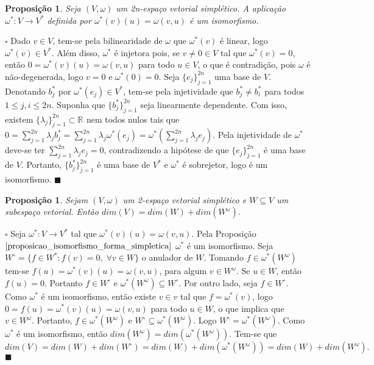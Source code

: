 \documentclass[12pt]{book}
\newtheorem{proposicao}[teorema]{Proposição}
\newenvironment{prova}[1]{$\square$ #1}{\hfill$\blacksquare$}
\newcommand{\colecaofinita}[2]{\{#1_{j} \}_{j=1}^{#2}}
\newcommand{\espacoSimpleticoOrtogonal}[1]{#1^{\omega}}
\newcommand{\real}[1]{\mathbb{R}^{#1}}
\newcommand{\reta}{\real{}}
\begin{document}
	\begin{proposicao}\label{proposicao_isomorfismo_forma_simpletica}
		Seja $(V,\omega)$ um 2n-espaço vetorial simplético. A aplicação $\omega^{*}:V\to V^{*}$ definida por $\omega^{*}(v)(u) = \omega(v,u)$ é um isomorfismo.
	\end{proposicao}
	\begin{prova}
		Dado $v \in V$, tem-se pela bilinearidade de $\omega$ que $\omega^{*}(v)$ é linear, logo $\omega^{*}(v) \in V^{*}$. Além disso, $\omega^{*}$ é injetora pois, se $v\neq 0 \in V$ tal que $\omega^{*}(v) = 0$, então $0= \omega^{*}(v)(u) = \omega(v,u)$ para todo $u \in V$, o que é contradição, pois $\omega$ é não-degenerada, logo $v =0$ e $\omega^{*}(0) = 0$. Seja $\colecaofinita{e}{2n}$ uma base de $V$. Denotando $b^{*}_{j}$ por $\omega^{*}(e_{j}) \in V^{*}$, tem-se pela injetividade que $b^{*}_{j} \neq b^{*}_{i}$ para todos $1\leq j,i\leq 2n$. Suponha que $\colecaofinita{b^{*}}{2n}$ seja linearmente dependente. Com isso, existem $\colecaofinita{\lambda}{2n} \subset \reta$ nem todos nulos tais que $0=\sum_{j=1}^{2n}\lambda_{j}b^{*}_{j} = \sum_{j=1}^{2n}\lambda_{j}\omega^{*}(e_{j}) = \omega^{*}(\sum_{j=1}^{2n}\lambda_{j}e_{j})$. Pela injetividade de $\omega^{*}$ deve-se ter $\sum_{j=1}^{2n}\lambda_{j}e_{j} = 0$, contradizendo a hipótese de que $\colecaofinita{e}{2n}$ é uma base de $V$. Portanto, $\colecaofinita{b^{*}}{2n}$ é uma base de $V^{*}$ e $\omega^{*}$ é sobrejetor, logo é um isomorfismo.
	\end{prova}
	
	\begin{proposicao}\label{proposicao_dimensao_subespaco_simpletico}
		Sejam $(V,\omega)$ um 2-espaço vetorial simplético e $W \subseteq V$ um subespaço vetorial. Então $dim(V) = dim(W) + dim(\espacoSimpleticoOrtogonal{W})$.
	\end{proposicao}
	\begin{prova}
		Seja $\omega^{*}: V \to V^{*}$ tal que $\omega^{*}(v)(u) = \omega(v,u)$. Pela Proposição $\ref{proposicao_isomorfismo_forma_simpletica}$ $\omega^{*}$ é um isomorfismo. Seja $W^{\circ}=\{f\in W^{*}: f(v) = 0,\; \forall v\in W \}$ o anulador de $W$. Tomando $f \in \omega^{*}(\espacoSimpleticoOrtogonal{W})$ tem-se $f(u) = \omega^{*}(v)(u)=\omega(v,u)$, para algum $v \in \espacoSimpleticoOrtogonal{W}$. Se $u\in W$, então $f(u) = 0$. Portanto $f \in W^{\circ}$ e  $\omega^{*}(\espacoSimpleticoOrtogonal{W})\subseteq W^{\circ}$. Por outro lado, seja $f \in W^{\circ}$. Como $\omega^{*}$ é um isomorfismo, então existe $v \in v$ tal que $f = \omega^{*}(v)$, logo $0=f(u) = \omega^{*}(v)(u) = \omega(v,u)$ para todo $u \in W$, o que implica que $v \in \espacoSimpleticoOrtogonal{W}$. Portanto, $f \in \omega^{*}(\espacoSimpleticoOrtogonal{W})$ e $W^{\circ} \subseteq \omega^{*}(\espacoSimpleticoOrtogonal{W})$. Logo $W^{\circ} =\omega^{*}(\espacoSimpleticoOrtogonal{W})$.
		Como $\omega^{*}$ é um isomorfismo, então $dim(\espacoSimpleticoOrtogonal{W}) = dim(\omega^{*}(\espacoSimpleticoOrtogonal{W}))$. Tem-se que 
		$$
		dim(V) = dim(W)+dim(W^{\circ}) = dim(W)+dim(\omega^{*}(\espacoSimpleticoOrtogonal{W})) = dim(W)+dim(\espacoSimpleticoOrtogonal{W}).
		$$ 
	\end{prova}
	
\end{document}
